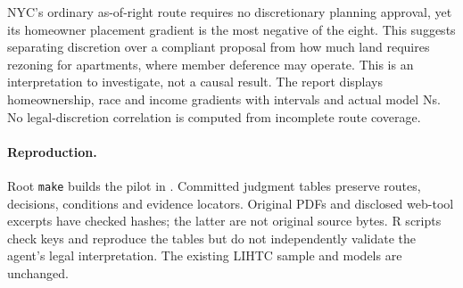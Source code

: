 \documentclass[11pt]{article}
\begin{document}
NYC's ordinary as-of-right route requires no discretionary planning approval,
yet its homeowner placement gradient is the most negative of the eight. This
suggests separating discretion over a compliant proposal from how much land
requires rezoning for apartments, where member deference may operate. This is
an interpretation to investigate, not a causal result. The report displays
homeownership, race and income gradients with intervals and actual model Ns.
No legal-discretion correlation is computed from incomplete route coverage.

\paragraph{Reproduction.} Root \texttt{make} builds the pilot in
. Committed judgment tables preserve
routes, decisions, conditions and evidence locators. Original PDFs and disclosed
web-tool excerpts have checked hashes; the latter are not original source bytes.
R scripts check keys and reproduce the tables but do not independently validate
the agent's legal interpretation. The existing LIHTC sample and models are unchanged.
\end{document}
